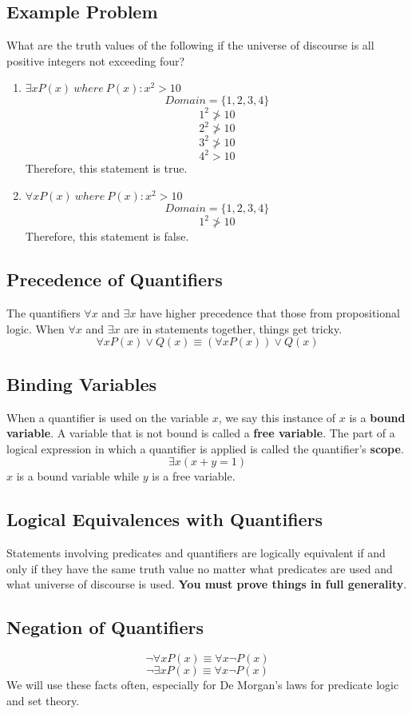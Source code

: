 \documentclass[letterpaper, 12pt]{math}
\begin{document}
\subsection*{Example Problem}
What are the truth values of the following if the universe of discourse is all
positive integers not exceeding four?
\begin{enumerate}
  \item \( \exists{x}P(x)\ where\ P(x):x^{2} > 10 \)
  \[ Domain = \{1, 2, 3, 4\} \]
  \[ 1^{2} \ngtr 10 \]
  \[ 2^{2} \ngtr 10 \]
  \[ 3^{2} \ngtr 10 \]
  \[ 4^{2} > 10 \]
  Therefore, this statement is true.
  \item \( \forall{x}P(x)\ where\ P(x):x^{2} > 10 \)
  \[ Domain = \{1, 2, 3, 4\} \]
  \[ 1^{2} \ngtr 10 \]
  Therefore, this statement is false.
\end{enumerate}

\subsection*{Precedence of Quantifiers}
The quantifiers \( \forall{x} \) and \( \exists{x} \) have higher precedence
that those from propositional logic. When \( \forall{x} \) and \( \exists{x} \)
are in statements together, things get tricky.
\[ \forall{x}P(x) \vee Q(x) \equiv (\forall{x}P(x)) \vee Q(x) \]

\subsection*{Binding Variables}
When a quantifier is used on the variable \( x \), we say this instance of
\( x \) is a \textbf{bound variable}. A variable that is not bound is called a
\textbf{free variable}. The part of a logical expression in which a quantifier
is applied is called the quantifier's \textbf{scope}.
\[ \exists{x}(x+y = 1) \]
\( x \) is a bound variable while \( y \) is a free variable.

\subsection*{Logical Equivalences with Quantifiers}
Statements involving predicates and quantifiers are logically equivalent if and
only if they have the same truth value no matter what predicates are used and
what universe of discourse is used. \textbf{You must prove things in full
generality}.

\subsection*{Negation of Quantifiers}
\[ \neg{\forall{x}P(x)} \equiv \forall x \neg{P(x)} \]
\[ \neg{\exists{x}P(x)} \equiv \forall x \neg{P(x)} \]
We will use these facts often, especially for De Morgan's laws for predicate
logic and set theory.
\end{document}
